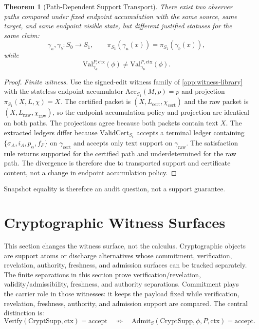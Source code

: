 \documentclass[11pt,twoside]{article}
\newtheorem{theorem}{Theorem}[section]
\theoremstyle{definition}
\newcommand{\CryptSupp}{\mathrm{CryptSupp}}
\newcommand{\ValidCert}{\mathrm{ValidCert}}
\newcommand{\Admit}{\mathrm{Admit}}
\newcommand{\Val}{\mathrm{Val}}
\newcommand{\Verify}{\mathrm{Verify}}
\newcommand{\Acc}{\mathrm{Acc}}
\newcommand{\ctx}{\mathrm{ctx}}
\newcommand{\supported}{\mathrm{supported}}
\newcommand{\underdetermined}{\mathrm{underdetermined}}
\begin{document}
\begin{theorem}[Path-Dependent Support Transport]
\label{thm:path-dependent-support-transport}
There exist two observer paths compared under fixed endpoint accumulation with
the same source, same target, and same endpoint visible state, but different
justified statuses for the same claim:
\[
  \gamma_a,\gamma_b:S_0\to S_1,
  \qquad
  \pi_{S_1}(\gamma_a(x))=\pi_{S_1}(\gamma_b(x)),
\]
while
\[
  \Val_{\gamma_a}^{P,\ctx}(\phi)\neq \Val_{\gamma_b}^{P,\ctx}(\phi).
\]
\end{theorem}

\begin{proof}
\textit{Finite witness.}
Use the signed-edit witness family of \cref{app:witness-library} with the
stateless endpoint accumulator
$\Acc_{S_1}(M,p)=p$ and projection $\pi_{S_1}(X,L,\chi)=X$. The certified
packet is $(X,L_{\mathrm{cert}},\chi_{\mathrm{cert}})$ and the raw packet is
$(X,L_{\mathrm{raw}},\chi_{\mathrm{raw}})$, so the endpoint accumulation
policy and projection are identical on both paths. The projections agree
because both packets contain text $X$. The extracted ledgers differ because
$\ValidCert_{S_1}$ accepts a terminal ledger containing
$\{\sigma_A,i_A,p_\alpha,f_F\}$ on $\gamma_{\mathrm{cert}}$ and accepts only
text support on $\gamma_{\mathrm{raw}}$. The satisfaction rule returns
$\supported$ for the certified path and $\underdetermined$ for the raw path.
The divergence is therefore due to transported support and certificate content,
not a change in endpoint accumulation policy.
\end{proof}

Snapshot equality is therefore an audit question, not a support guarantee.

\section{Cryptographic Witness Surfaces}
\label{sec:crypto}

This section changes the witness surface, not the calculus. Cryptographic
objects are support atoms or discharge alternatives whose commitment,
verification, revelation, authority, freshness, and admission surfaces can be
tracked separately. The finite separations in this section prove
verification/revelation, validity/admissibility, freshness, and authority
separations. Commitment plays the carrier role in those witnesses: it keeps
the payload fixed while verification, revelation, freshness, authority, and
admission support are compared. The central distinction is:
\[
  \Verify(\CryptSupp,\ctx)=\mathrm{accept}
  \quad\not\Rightarrow\quad
  \Admit_S(\CryptSupp,\phi,P,\ctx)=\mathrm{accept}.
\]
\end{document}

